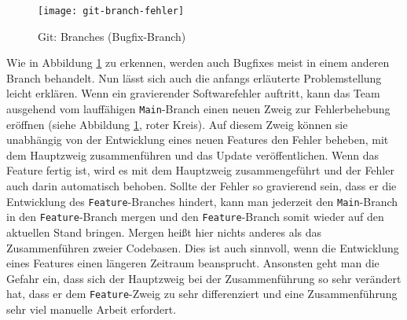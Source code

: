 \begin{figure}[H]
    \centering
    \texttt{[image: git-branch-fehler]}
    \caption{Git: Branches (Bugfix-Branch)}
    \label{fig:git-branch-fehler}
\end{figure}

Wie in Abbildung \ref{fig:git-branch-fehler} zu erkennen, werden auch Bugfixes
meist in einem anderen Branch behandelt. Nun lässt sich auch die anfangs
erläuterte Problemstellung leicht erklären. Wenn ein gravierender Softwarefehler
auftritt, kann das Team ausgehend vom lauffähigen \texttt{Main}-Branch einen
neuen Zweig zur Fehlerbehebung eröffnen (siehe Abbildung
\ref{fig:git-branch-fehler}, roter Kreis). Auf diesem Zweig können sie
unabhängig von der Entwicklung eines neuen Features den Fehler beheben, mit dem
Hauptzweig zusammenführen und das Update veröffentlichen. Wenn das Feature
fertig ist, wird es mit dem Hauptzweig zusammengeführt und der Fehler auch darin automatisch behoben. Sollte der Fehler so gravierend sein, dass er die
Entwicklung des \texttt{Feature}-Branches hindert, kann man jederzeit den
\texttt{Main}-Branch in den \texttt{Feature}-Branch mergen und den
\texttt{Feature}-Branch somit wieder auf den aktuellen Stand bringen. Mergen
heißt hier nichts anderes als das Zusammenführen zweier Codebasen. Dies ist auch
sinnvoll, wenn die Entwicklung eines Features einen längeren Zeitraum
beansprucht. Ansonsten geht man die Gefahr ein, dass sich der Hauptzweig bei der
Zusammenführung so sehr verändert hat, dass er dem \texttt{Feature}-Zweig zu
sehr differenziert und eine Zusammenführung sehr viel manuelle Arbeit erfordert.
